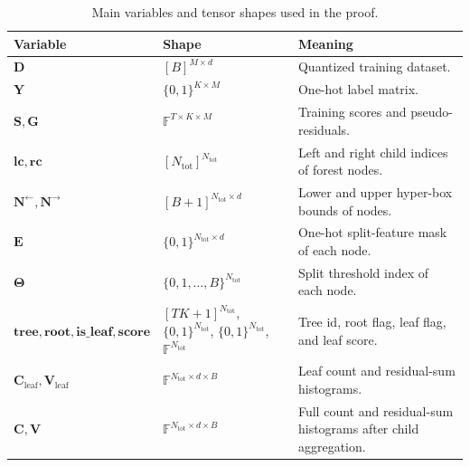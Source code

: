 \begin{table}[t]
    \centering
    \small
    \caption{Main variables and tensor shapes used in the proof.}
    \label{tab:main-variables}
    \begin{tabular}{@{}p{}p{}p{}@{}}
        \toprule
        Variable & Shape & Meaning \\
        \midrule
        $\mathbf{D}$ & $[B]^{M\times d}$ & Quantized training dataset. \\
        $\mathbf{Y}$ & $\{0,1\}^{K\times M}$ & One-hot label matrix. \\
        $\mathbf{S},\mathbf{G}$ & $\mathbb{F}^{T\times K\times M}$ & Training scores and pseudo-residuals. \\
        $\mathbf{lc},\mathbf{rc}$ & $[N_{\mathrm{tot}}]^{N_{\mathrm{tot}}}$ & Left and right child indices of forest nodes. \\
        $\mathbf{N}^{\leftarrow},\mathbf{N}^{\rightarrow}$ & $[B+1]^{N_{\mathrm{tot}}\times d}$ & Lower and upper hyper-box bounds of nodes. \\
        $\mathbf{E}$ & $\{0,1\}^{N_{\mathrm{tot}}\times d}$ & One-hot split-feature mask of each node. \\
        $\boldsymbol{\Theta}$ & $\{0,1,\ldots,B\}^{N_{\mathrm{tot}}}$ & Split threshold index of each node. \\
        $\mathbf{tree},\mathbf{root},\mathbf{is\_leaf},\mathbf{score}$ & $[TK+1]^{N_{\mathrm{tot}}}$, $\{0,1\}^{N_{\mathrm{tot}}}$, $\{0,1\}^{N_{\mathrm{tot}}}$, $\mathbb{F}^{N_{\mathrm{tot}}}$ & Tree id, root flag, leaf flag, and leaf score. \\
        $\mathbf{C}_{\mathrm{leaf}},\mathbf{V}_{\mathrm{leaf}}$ & $\mathbb{F}^{N_{\mathrm{tot}}\times d\times B}$ & Leaf count and residual-sum histograms. \\
        $\mathbf{C},\mathbf{V}$ & $\mathbb{F}^{N_{\mathrm{tot}}\times d\times B}$ & Full count and residual-sum histograms after child aggregation. \\

\end{tabular}
\end{table}
